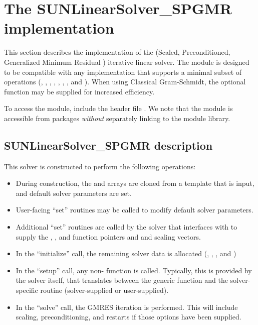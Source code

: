 \section{The SUNLinearSolver\_SPGMR implementation}
\label{ss:sunlinsol_spgmr}

This section describes the {\sunlinsol} implementation of the {\spgmr}
(Scaled, Preconditioned, Generalized Minimum Residual \cite{SaSc:86})
iterative linear solver. The {\sunlinsolspgmr} module is designed to be
compatible with any {\nvector} implementation that supports a minimal subset
of operations (, , ,
, , , , and
). When using Classical Gram-Schmidt, the optional function
 may be supplied for increased efficiency.

To access the {\sunlinsolspgmr} module, include the header file
. We note that the {\sunlinsolspgmr} module is
accessible from {\sundials} packages \textit{without} separately linking to
the  module library.


\subsection{SUNLinearSolver\_SPGMR description}
\label{ss:sunlinsol_spgmr_description}

This solver is constructed to perform the following operations:
\begin{itemize}
\item During construction, the  and  arrays are
  cloned from a template {\nvector} that is input, and default solver
  parameters are set.
\item User-facing ``set'' routines may be called to modify default
  solver parameters.
\item Additional ``set'' routines are called by the {\sundials} solver
  that interfaces with {\sunlinsolspgmr} to supply the
  , , and  function pointers and
   and  scaling vectors.
\item In the ``initialize'' call, the remaining solver data is
  allocated (, , , and  )
\item In the ``setup'' call, any non-
   function is called.  Typically, this is provided by
  the {\sundials} solver itself, that translates between the
  generic  function and the
  solver-specific routine (solver-supplied or user-supplied).
\item In the ``solve'' call, the GMRES iteration is performed.  This
  will include scaling, preconditioning, and restarts if those options
  have been supplied.
\end{itemize}


